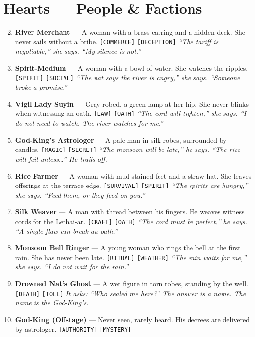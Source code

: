 \section*{Hearts --- People \& Factions}
\label{sec:ayokha-people}
\begin{enumerate}
\setcounter{enumi}{1}
\item \textbf{River Merchant} --- A woman with a brass earring and a hidden deck. She never sails without a bribe. \texttt{[COMMERCE]} \texttt{[DECEPTION]}
  \hfill \textit{``The tariff is negotiable,'' she says. ``My silence is not.''}
\item \textbf{Spirit-Medium} --- A woman with a bowl of water. She watches the ripples. \texttt{[SPIRIT]} \texttt{[SOCIAL]}
  \hfill \textit{``The nat says the river is angry,'' she says. ``Someone broke a promise.''}
\item \textbf{Vigil Lady Suyin} --- Gray-robed, a green lamp at her hip. She never blinks when witnessing an oath. \texttt{[LAW]} \texttt{[OATH]}
  \hfill \textit{``The cord will tighten,'' she says. ``I do not need to watch. The river watches for me.''}
\item \textbf{God-King's Astrologer} --- A pale man in silk robes, surrounded by candles. \texttt{[MAGIC]} \texttt{[SECRET]}
  \hfill \textit{``The monsoon will be late,'' he says. ``The rice will fail unless\dots'' He trails off.}
\item \textbf{Rice Farmer} --- A woman with mud-stained feet and a straw hat. She leaves offerings at the terrace edge. \texttt{[SURVIVAL]} \texttt{[SPIRIT]}
  \hfill \textit{``The spirits are hungry,'' she says. ``Feed them, or they feed on you.''}
\item \textbf{Silk Weaver} --- A man with thread between his fingers. He weaves witness cords for the Lethai-ar. \texttt{[CRAFT]} \texttt{[OATH]}
  \hfill \textit{``The cord must be perfect,'' he says. ``A single flaw can break an oath.''}
\item \textbf{Monsoon Bell Ringer} --- A young woman who rings the bell at the first rain. She has never been late. \texttt{[RITUAL]} \texttt{[WEATHER]}
  \hfill \textit{``The rain waits for me,'' she says. ``I do not wait for the rain.''}
\item \textbf{Drowned Nat's Ghost} --- A wet figure in torn robes, standing by the well. \texttt{[DEATH]} \texttt{[TOLL]}
  \hfill \textit{It asks: ``Who sealed me here?'' The answer is a name. The name is the God-King's.}
\item \textbf{God-King (Offstage)} --- Never seen, rarely heard. His decrees are delivered by astrologer. \texttt{[AUTHORITY]} \texttt{[MYSTERY]}

\end{enumerate}
